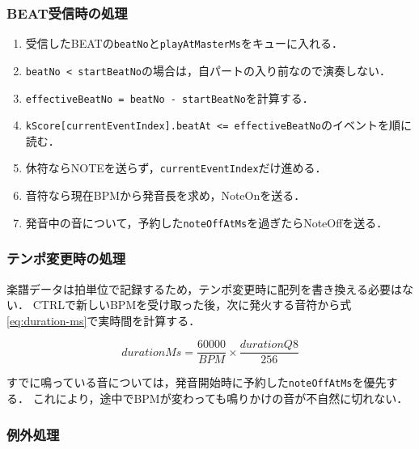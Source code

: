 \documentclass[lualatex,book,paper=a4paper,jafontsize=11.5pt,jafontscale=1.05]{jlreq}
\newcommand{\code}[1]{\texttt{#1}}
\begin{document}
\subsubsection{BEAT受信時の処理}

\begin{enumerate}
  \item 受信したBEATの\code{beatNo}と\code{playAtMasterMs}をキューに入れる．
  \item \code{beatNo < startBeatNo}の場合は，自パートの入り前なので演奏しない．
  \item \code{effectiveBeatNo = beatNo - startBeatNo}を計算する．
  \item \code{kScore[currentEventIndex].beatAt <= effectiveBeatNo}のイベントを順に読む．
  \item 休符ならNOTEを送らず，\code{currentEventIndex}だけ進める．
  \item 音符なら現在BPMから発音長を求め，NoteOnを送る．
  \item 発音中の音について，予約した\code{noteOffAtMs}を過ぎたらNoteOffを送る．
\end{enumerate}

\subsubsection{テンポ変更時の処理}

楽譜データは拍単位で記録するため，テンポ変更時に配列を書き換える必要はない．
CTRLで新しいBPMを受け取った後，次に発火する音符から式\ref{eq:duration-ms}で実時間を計算する．

\begin{equation}
\label{eq:duration-ms}
durationMs = \frac{60000}{BPM} \times \frac{durationQ8}{256}
\end{equation}

すでに鳴っている音については，発音開始時に予約した\code{noteOffAtMs}を優先する．
これにより，途中でBPMが変わっても鳴りかけの音が不自然に切れない．

\subsubsection{例外処理}
\end{document}
